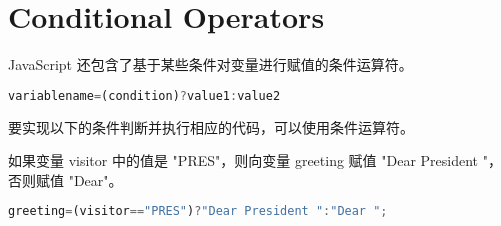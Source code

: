 \section{Conditional Operators}


JavaScript 还包含了基于某些条件对变量进行赋值的条件运算符。



\begin{lstlisting}[language=JavaScript]
variablename=(condition)?value1:value2 
\end{lstlisting}


要实现以下的条件判断并执行相应的代码，可以使用条件运算符。

如果变量 visitor 中的值是 "PRES"，则向变量 greeting 赋值 "Dear President "，否则赋值 "Dear"。


\begin{lstlisting}[language=JavaScript]
greeting=(visitor=="PRES")?"Dear President ":"Dear ";
\end{lstlisting}









